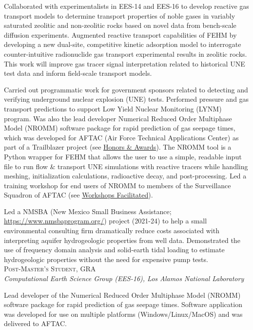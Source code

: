 \documentclass[11pt, letterpaper]{article}
\newcommand{\years}[1]{\marginnote{\scriptsize #1}}
\begin{document}
    Collaborated with experimentalists in EES-14 and EES-16 to develop reactive
    gas transport models to determine transport properties of noble gases in
    variably saturated zeolitic and non-zeolitic rocks based on novel data from
    bench-scale diffusion experiments. Augmented reactive transport
    capabilities of FEHM by developing a new dual-site, competitive kinetic
    adsorption model to interrogate counter-intuitive radionuclide gas
    transport experimental results in zeolitic rocks. This work will improve
    gas tracer signal interpretation related to historical UNE test data and
    inform field-scale transport models.

    Carried out programmatic work for government sponsors related to detecting
    and verifying underground nuclear explosion (UNE) tests. Performed pressure
    and gas transport predictions to support Low Yield Nuclear Monitoring
    (LYNM) program.  Was also the lead developer Numerical Reduced Order
    Multiphase Model (NROMM) software package for rapid prediction of gas
    seepage times, which was developed for AFTAC (Air Force Technical
    Applications Center) as part of a Trailblazer project (see
    \hyperref[sec:awards]{Honors \& Awards}). The NROMM tool is a Python
    wrapper for FEHM that allows the user to use a simple, readable input file
    to run flow \& transport UNE simulations with reactive tracers while
    handling meshing, initialization calculations, radioactive decay, and
    post-processing. Led a training workshop for end users of NROMM to members of
    the  Surveillance Squadron of AFTAC  (see
    \hyperref[sec:workshopsFacilitated]{Workshops Facilitated}). 

	Led a NMSBA (New Mexico Small Business Assistance;
	\href{https://www.nmsbaprogram.org/}{https://www.nmsbaprogram.org/})
	project (2021-24) to help a small environmental consulting firm dramatically reduce
	costs associated with interpreting aquifer hydrogeologic properties from
	well data.  Demonstrated the use of frequency domain analysis and
	solid-earth tidal loading to estimate hydrogeologic properties without the
	need for expensive pump tests. \\

\noindent
\years{2017 - 2019}\textsc{Post-Master's Student, GRA}\\
\textit{Computational Earth Science Group (EES-16), Los Alamos National Laboratory}

    \vspace{3pt} \noindent  
	Lead developer of the Numerical Reduced Order Multiphase Model (NROMM)
	software package for rapid prediction of gas seepage times. Software
	application was developed for use on multiple platforms
	(Windows/Linux/MacOS) and was delivered to AFTAC.
\end{document}
